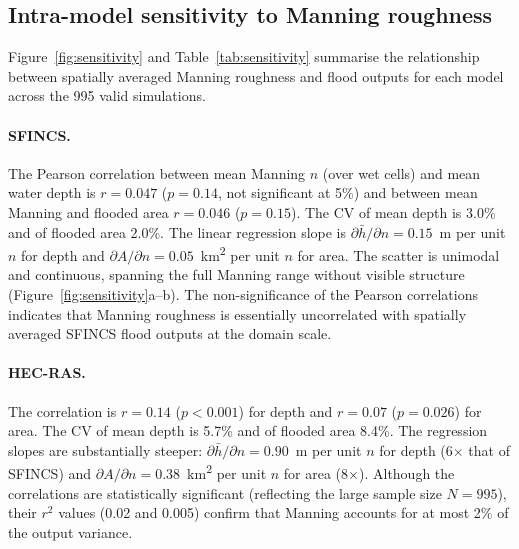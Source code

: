 \documentclass[review,12pt]{elsarticle}
\newcommand{\sfincs}{\textsc{SFINCS}}
\begin{document}
\subsection{Intra-model sensitivity to Manning roughness}
\label{sec:intra}

Figure~\ref{fig:sensitivity} and Table~\ref{tab:sensitivity} summarise the
relationship between spatially averaged Manning roughness and flood outputs
for each model across the 995 valid simulations.

\paragraph{SFINCS.}
The Pearson correlation between mean Manning $n$ (over wet cells) and mean
water depth is $r = 0.047$ ($p = 0.14$, not significant at 5\%) and between
mean Manning and flooded area $r = 0.046$ ($p = 0.15$).
The CV of mean depth is 3.0\% and of flooded area 2.0\%.
The linear regression slope is $\partial\bar{h}/\partial n = 0.15$~m per
unit $n$ for depth and $\partial A/\partial n = 0.05$~km\textsuperscript{2}
per unit $n$ for area.
The scatter is unimodal and continuous, spanning the full Manning range
without visible structure (Figure~\ref{fig:sensitivity}a--b).
The non-significance of the Pearson correlations indicates that Manning
roughness is essentially uncorrelated with spatially averaged \sfincs{}
flood outputs at the domain scale.

\paragraph{HEC-RAS.}
The correlation is $r = 0.14$ ($p < 0.001$) for depth and
$r = 0.07$ ($p = 0.026$) for area.
The CV of mean depth is 5.7\% and of flooded area 8.4\%.
The regression slopes are substantially steeper:
$\partial\bar{h}/\partial n = 0.90$~m per unit $n$ for depth (6$\times$ that
of \sfincs{}) and $\partial A/\partial n = 0.38$~km\textsuperscript{2} per
unit $n$ for area (8$\times$).
Although the correlations are statistically significant (reflecting the
large sample size $N = 995$), their $r^2$ values (0.02 and 0.005) confirm
that Manning accounts for at most 2\% of the output variance.
\end{document}
